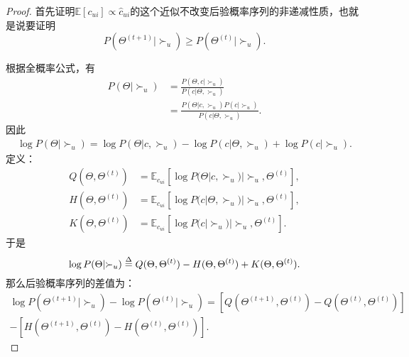 \begin{proof}
首先证明$\mathbb{E}[c_{ui}] \propto {{\hat c}_{ui}} $的这个近似不改变后验概率序列的非递减性质，也就是说要证明
\begin{equation}\label{eq20}
	P({\Theta ^{(t + 1)}}|{ \succ _u}) \ge P({\Theta ^{(t)}}|{ \succ _u}).
\end{equation}

\par
根据全概率公式，有
\begin{equation}\label{eq21}
	\begin{split}
		P(\Theta |{ \succ _u}) &= \frac{{P(\Theta ,c|{ \succ _u})}}{{P(c|\Theta ,{ \succ _u})}}\\
		& = \frac{{P(\Theta |c,{ \succ _u})P(c|{ \succ _u})}}{{P(c|\Theta ,{ \succ _u})}}.
	\end{split}
\end{equation}
因此
\begin{equation}\label{eq22}
	\begin{aligned}
		\log P(\Theta |{ \succ _u}) = \log P(\Theta |c,{ \succ _u}) - \log P(c|\Theta ,{ \succ _u})
		+ \log P(c|{ \succ _u}).
	\end{aligned}
\end{equation}
定义：
\begin{equation}\label{eq23}
	\begin{split}
		Q(\Theta ,{\Theta ^{(t)}}) &= {\mathbb{E}_{{c_{ui}}}}[\log P(\Theta |c,{ \succ _u})|{ \succ _u},{\Theta ^{(t)}}],\\
		H(\Theta ,{\Theta ^{(t)}}) &= {\mathbb{E}_{{c_{ui}}}}[\log P(c|\Theta ,{ \succ _u})|{ \succ _u},{\Theta ^{(t)}}],\\
		K(\Theta ,{\Theta ^{(t)}}) &= {\mathbb{E}_{{c_{ui}}}}[\log P(c|{ \succ _u})|{ \succ _u},{\Theta ^{(t)}}].
	\end{split}
\end{equation}
于是
\begin{equation}\label{eq24}
	\log P(\Theta |{ \succ _u}) \buildrel \Delta \over = Q(\Theta ,{\Theta ^{(t)}}) - H(\Theta ,{\Theta ^{(t)}}) + K(\Theta ,{\Theta ^{(t)}}).
\end{equation}
那么后验概率序列的差值为：
\begin{equation}\label{eq25}
	\begin{aligned}
		\log P({\Theta ^{(t + 1)}}|{ \succ _u}) - \log P({\Theta ^{(t)}}|{ \succ _u})
		= [Q({\Theta ^{(t + 1)}},{\Theta ^{(t)}}) - Q({\Theta ^{(t)}},{\Theta ^{(t)}})] \\
		- [H({\Theta ^{(t + 1)}},{\Theta ^{(t)}}) - H({\Theta ^{(t)}},{\Theta ^{(t)}})].
	\end{aligned}
\end{equation}


\end{proof}
